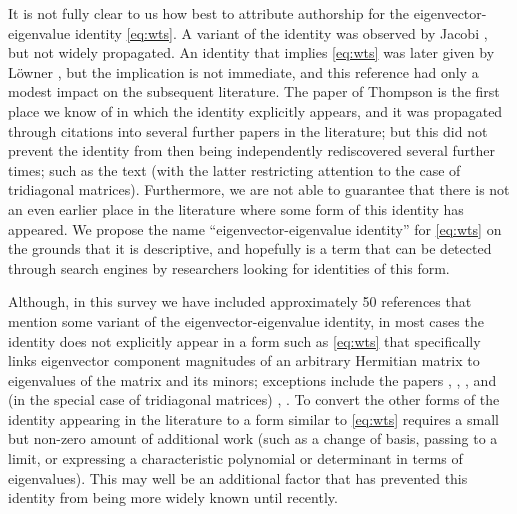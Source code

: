 \documentclass[12pt]{amsart}
\begin{document}
It is not fully clear to us how best to attribute authorship for the eigenvector-eigenvalue identity \eqref{eq:wts}.  A variant of the identity was observed by Jacobi \cite{jacobi}, but not widely propagated.  An identity that implies \eqref{eq:wts} was later given by L\"owner \cite{Lowner}, but the implication is not immediate, and this reference had only a modest impact on the subsequent literature.  The paper of Thompson \cite{Thompson:1966} is the first  place we know of in which the identity explicitly appears, and it was propagated through citations into several further papers in the literature; but this did not prevent the identity from then being independently rediscovered several further times; such as the text \cite{golub} (with the latter restricting attention to the case of tridiagonal matrices).  Furthermore, we are not able to guarantee that there is not an even earlier place in the literature where some form of this identity has appeared.  We propose the name ``eigenvector-eigenvalue identity'' for \eqref{eq:wts} on the grounds that it is descriptive, and hopefully is a term that can be detected through search engines by researchers looking for identities of this form.


Although, in this survey we have included approximately 50 references that mention some variant of the eigenvector-eigenvalue identity, in most cases the identity does not explicitly appear in a form such as  \eqref{eq:wts} that specifically links eigenvector component magnitudes of an arbitrary Hermitian matrix to eigenvalues of the matrix and its minors; exceptions include the papers \cite{Thompson:1966} , \cite{Thompson:1968}, \cite{NTU}, and (in the special case of tridiagonal matrices) \cite{golub}, \cite{xu}.  To convert the other forms of the identity appearing in the literature to a form similar to  \eqref{eq:wts} requires a small but non-zero amount of additional work (such as a change of basis, passing to a limit, or expressing a characteristic polynomial or determinant in terms of eigenvalues).  This may well be an additional factor that has prevented this identity from being more widely known until recently.
\end{document}
